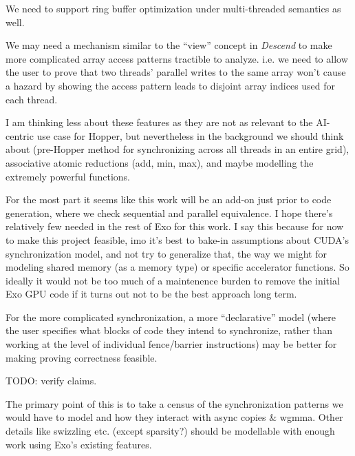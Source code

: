 \filbreak
{} We need to support ring buffer optimization under multi-threaded semantics as well.

\filbreak
{} We may need a mechanism similar to the ``view'' concept in \textit{Descend} to make more complicated array access patterns tractible to analyze. i.e. we need to allow the user to prove that two threads' parallel writes to the same array won't cause a hazard by showing the access pattern leads to disjoint array indices used for each thread.

\filbreak
{} I am thinking less about these features as they are not as relevant to the AI-centric use case for Hopper, but nevertheless in the background we should think about  (pre-Hopper method for synchronizing across all threads in an entire grid), associative atomic reductions (add, min, max), and maybe modelling the extremely powerful  functions.

\filbreak
{}

For the most part it seems like this work will be an add-on just prior to code generation, where we check sequential and parallel equivalence. I hope there's relatively few  needed in the rest of Exo for this work. I say this because for now to make this project feasible, imo it's best to bake-in assumptions about CUDA's synchronization model, and not try to generalize that, the way we might for modeling shared memory (as a memory type) or specific accelerator functions. So ideally it would not be too much of a maintenence burden to remove the initial Exo GPU code if it turns out not to be the best approach long term.

\filbreak
For the more complicated synchronization, a more ``declarative'' model (where the user specifies what blocks of code they intend to synchronize, rather than working at the level of individual fence/barrier instructions) may be better for making proving correctness feasible.

\newpage
{}

TODO: verify  claims.

The primary point of this is to take a census of the synchronization patterns we would have to model and how they interact with async copies \& wgmma.
Other details like swizzling etc. (except sparsity?) should be modellable with enough work using Exo's existing features.

